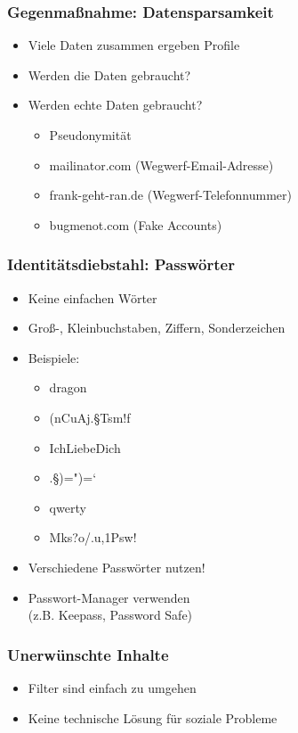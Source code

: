 \begin{frame}
  \frametitle{Gegenmaßnahme: Datensparsamkeit}
  \begin{itemize}
      \item<2-> Viele Daten zusammen ergeben Profile
      \item<3-> Werden die Daten gebraucht?
      \item<4-> Werden echte Daten gebraucht?
          \begin{itemize}
            \item<5-> Pseudonymität
            \item<6-> mailinator.com (Wegwerf-Email-Adresse)
            \item<7-> frank-geht-ran.de (Wegwerf-Telefonnummer)
            \item<8-> bugmenot.com (Fake Accounts)
          \end{itemize}
  \end{itemize}
\end{frame}

\begin{frame}
    \frametitle{Identitätsdiebstahl: Passwörter}
    \begin{itemize}
        \item<2-> Keine einfachen Wörter
        \item<3-> Groß-, Kleinbuchstaben, Ziffern, Sonderzeichen
        \item<4-> Beispiele:
            \begin{itemize}
                \item<5-> dragon
                \item<6-> (nCuAj.§Tsm!f
                \item<7-> IchLiebeDich
                \item<8-> .§)=")=`
                \item<10-> qwerty
                \item<11-> Mks?o/.u,1Psw!
            \end{itemize}
        \item<12-> Verschiedene Passwörter nutzen!
        \item<13-> Passwort-Manager verwenden \\ (z.B. Keepass, Password Safe)
    \end{itemize}
\end{frame}

\begin{frame}
  \frametitle{Unerwünschte Inhalte}
  \begin{itemize}
    \item<2-> Filter sind einfach zu umgehen
    \item<3-> Keine technische Lösung für soziale Probleme
  \end{itemize}
\end{frame}

